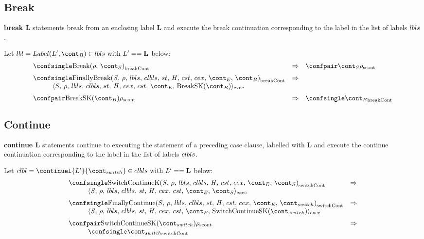\documentclass{article}
\begin{document}
\subsection{Break}
\textbf{break L} statements break from an enclosing label \textbf{L} and execute the break continuation corresponding to the label in the list of labels $lbls$.

Let $\lbl = Label(L', \bcont) \in \lbls \textrm{ with } L' == \mathbf{L}$ below:
\[
  \begin{array}{lcl}
	\breakconf{\Break{\env}{\scont}}
	& \Rightarrow &
	\scontconf{\scont}{\env}\\[2mm]

	\breakconf{\FinallyBreak{\stmt}{\bcont}}
	& \Rightarrow \\
	\hspace{10mm}\execconf{\stmt}{\env}{\lbls}{\clbls}{\handler}{\cex}{\cstrace}{\econt}{\mathrm{BreakSK}(\bcont)}\\[2mm]

	\scontconf{\mathrm{BreakSK}(\bcont)}{\env}
	& \Rightarrow &
	\breakconf{\bcont}

  \end{array}
\]

\subsection{Continue}
\textbf{continue L} statements continue to executing the statement of a preceding case clause, labelled with \textbf{L} and execute the continue continuation corresponding to the label in the list of labels $clbls$.

Let $\clbl = \continuel{L'}{\switchcont} \in \clbls \textrm{ with } L' == \mathbf{L}$ below:
\[
  \begin{array}{lcl}
	\switchconf{\ContinueK}
	& \Rightarrow \\
	\hspace{10mm}\execconf{\stmt}{\env}{\lbls}{\clbls}{\handler}{\cex}{\cstrace}{\econt}{\scont}\\[2mm]

	\switchconf{\FinallyContinue{\stmt}{\switchcont}}
	& \Rightarrow \\
	\hspace{10mm}\execconf{\stmt}{\env}{\lbls}{\clbls}{\handler}{\cex}{\cstrace}{\econt}{\mathrm{SwitchContinueSK}(\switchcont)}\\[2mm]

	\scontconf{\mathrm{SwitchContinueSK}(\switchcont)}{\env}
	& \Rightarrow \\
	\hspace{10mm}\switchconf{\switchcont}
  \end{array}
\]
\end{document}
